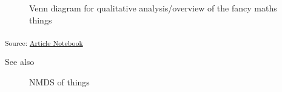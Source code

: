 \documentclass[
  letterpaper,
  DIV=11,
  numbers=noendperiod]{scrartcl}
\begin{document}
\begin{figure}[H]


\caption{\label{fig-venn}Venn diagram for qualitative analysis/overview
of the fancy maths things}

\end{figure}%

\textsubscript{Source:
\href{https://BecksLab.github.io/ms_t_is_for_topology/index.qmd.html}{Article
Notebook}}

See also

\begin{figure}[H]


\caption{\label{fig-nmds}NMDS of things}

\end{figure}%
\end{document}
